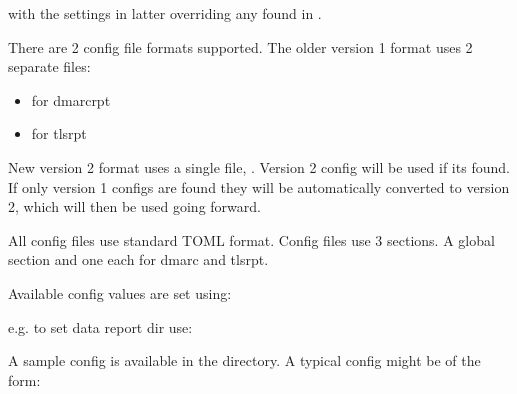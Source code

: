\documentclass[letterpaper,10pt,english]{sphinxmanual}
\begin{document}
\begin{sphinxVerbatim}[commandchars=\\\{\}]
\end{sphinxVerbatim}

\sphinxAtStartPar
with the settings in latter  overriding any found in .

\sphinxAtStartPar
There are 2 config file formats supported. The older version 1 format uses 2 separate files:
\begin{itemize}
\item {} 
\sphinxAtStartPar
{} \sphinxhyphen{} for dmarc\sphinxhyphen{}rpt

\item {} 
\sphinxAtStartPar
{} \sphinxhyphen{} for tls\sphinxhyphen{}rpt

\end{itemize}

\sphinxAtStartPar
New version 2 format uses a single file, . Version 2 config will be used if its found.
If only version 1 configs are found they will be automatically converted to version 2, which
will then be used going forward.

\sphinxAtStartPar
All config files use standard TOML format. Config files use 3 sections. A global section
and one each for dmarc and tls\sphinxhyphen{}rpt.

\sphinxAtStartPar
Available config values are set using:

\begin{sphinxVerbatim}[commandchars=\\\{\}]
  
\end{sphinxVerbatim}

\sphinxAtStartPar
e.g. to set data report dir use:

\begin{sphinxVerbatim}[commandchars=\\\{\}]
  
\end{sphinxVerbatim}

\sphinxAtStartPar
A sample config is available in the  directory. A typical config might be of the form:
\end{document}
